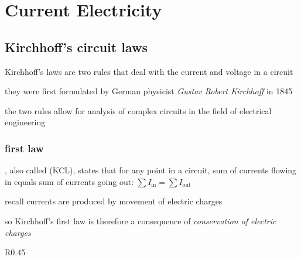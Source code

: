 \section{Current Electricity}




\subsection{Kirchhoff's circuit laws}

Kirchhoff's laws are two rules that deal with the current and voltage in a circuit

they were first formulated by German physicist \emph{Gustav Robert Kirchhoff} in 1845

the two rules allow for analysis of complex circuits in the field of electrical engineering

\subsubsection{first law}

\begin{ilight}
	, also called  (KCL), states that for any point in a circuit, sum of currents flowing in equals sum of currents going out: $\boxed{\sum I_\text{in} = \sum I_\text{out}}$
\end{ilight}

\cmt recall currents are produced by movement of electric charges

so Kirchhoff's first law is therefore a consequence of \emph{conservation of electric charges}

\begin{wrapfigure}{R}{0.45\textwidth}
	\vspace{-21pt}
	\begin{center}
	\end{center}
	\vspace{-20pt}
\end{wrapfigure}

